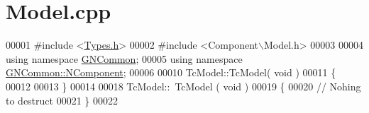 \hypertarget{_model_8cpp_source}{}\section{Model.\+cpp}
\label{_model_8cpp_source}

\begin{DoxyCode}
00001 \textcolor{preprocessor}{#include <\mbox{\hyperlink{_types_8h}{Types.h}}>}
00002 \textcolor{preprocessor}{#include <Component\(\backslash\)Model.h>}
00003 
00004 \textcolor{keyword}{using namespace }\mbox{\hyperlink{namespace_g_n_common}{GNCommon}};
00005 \textcolor{keyword}{using namespace }\mbox{\hyperlink{namespace_g_n_common_1_1_n_component}{GNCommon::NComponent}};
00006 
00010 TcModel::TcModel( \textcolor{keywordtype}{void} )
00011 \{
00012 
00013 \}
00014 
00018 TcModel::~TcModel ( \textcolor{keywordtype}{void} )
00019 \{
00020    \textcolor{comment}{// Nohing to destruct}
00021 \}
00022 
\end{DoxyCode}
